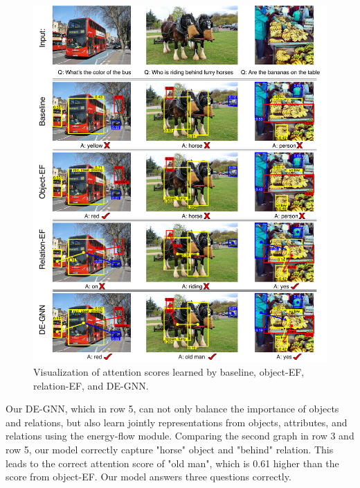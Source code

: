\documentclass[letterpaper]{article} %
\begin{document}
\begin{figure}[h] 
    \flushleft
    \vspace{-0.1in}
    \centering 
    \includegraphics[scale=0.32]{./pic/visual2.pdf} 
    \caption{Visualization of attention scores learned by baseline, object-EF, relation-EF, and DE-GNN.} 
    \label{visual} 
    \vspace{-0.2in}
\end{figure}

Our DE-GNN, which in row 5, can not only balance the importance of objects and relations, but also learn jointly representations from objects, attributes, and relations using the energy-flow module. Comparing the second graph in row 3 and row 5, our model correctly capture "horse" object and "behind" relation. This leads to the correct attention score of "old man", which is 0.61 higher than the score from object-EF. Our model answers three questions correctly.
\end{document}
